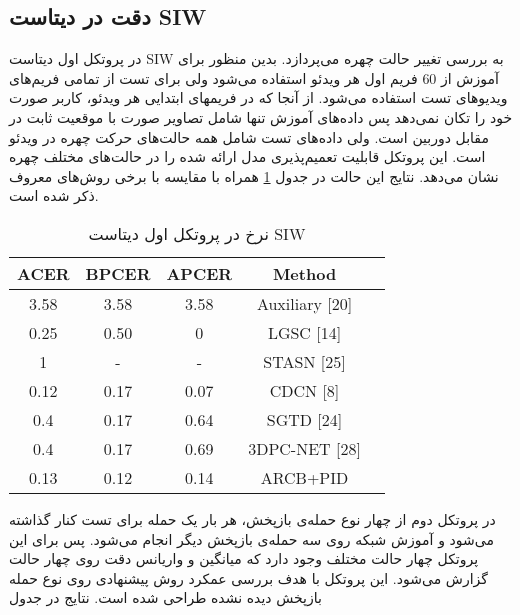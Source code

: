 \subsection{دقت در دیتاست SIW}
در پروتکل اول دیتاست SIW به بررسی تغییر حالت چهره می‌پردازد. بدین منظور برای آموزش از 60 فریم اول هر ویدئو استفاده می‌شود ولی برای تست از تمامی فریم‌های ویدیوهای تست استفاده می‌شود. از آنجا که در فریم­های ابتدایی هر ویدئو، کاربر صورت خود را تکان نمی‌دهد پس داده‌های آموزش تنها شامل تصاویر صورت با موقعیت ثابت در مقابل دوربین است. ولی داده‌های تست شامل همه حالت‌های حرکت چهره در ویدئو است. این پروتکل قابلیت تعمیم‌پذیری مدل ارائه شده را در حالت‌های مختلف چهره نشان می‌دهد. نتایج این حالت در جدول
\ref{tab:siw1}
همراه با مقایسه با برخی روش‌های معروف ذکر شده است.
\begin{table}[ht]
	\caption{نرخ در پروتکل اول دیتاست SIW}
	\label{tab:siw1}
	\centering
	\onehalfspacing
	\begin{tabular}{|c|c|c|c|c|}
	\hline ACER & BPCER & APCER & Method                \\
	\hline 3.58 & 3.58  & 3.58  & Auxiliary {[}20{]}   \\
	\hline 0.25 & 0.50  & 0     & LGSC {[}14{]}          \\
	\hline 1    & -     & -     & STASN {[}25{]}       \\
	\hline 0.12 & 0.17  & 0.07  & CDCN {[}8{]}            \\
	\hline 0.4  & 0.17  & 0.64  & SGTD 				{[}24{]}      \\
	\hline 0.4  & 0.17  & 0.69  & 3DPC-NET 				{[}28{]}   \\
	\hline 0.13 & 0.12  & 0.14  & ARCB+PID    \\ 
	 \hline         
	\end{tabular}
\end{table}

در پروتکل دوم از چهار نوع حمله‌ی بازپخش، هر بار یک حمله برای تست کنار گذاشته می‌شود و آموزش شبکه روی سه حمله‌ی بازپخش دیگر انجام می‌شود. پس برای این پروتکل چهار حالت مختلف وجود دارد که میانگین و واریانس دقت روی چهار حالت گزارش می‌شود. این پروتکل با هدف بررسی عمکرد روش پیشنهادی روی نوع حمله بازپخش دیده نشده طراحی شده است. نتایج در جدول 

